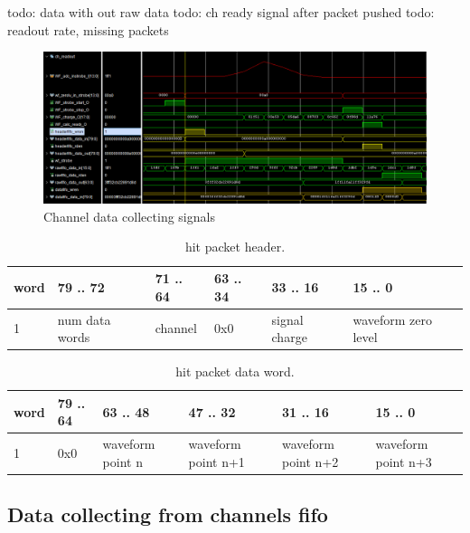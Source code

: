 \documentclass{article}
\begin{document}
todo: data with out raw data
todo: ch ready signal after packet pushed
todo: readout rate, missing packets

\begin{figure}[H]
	\centering 
	\includegraphics[width=1.0\textwidth]{ADC_ch_data_collector_wave.png}
	\caption{\label{fig:2} Channel data collecting signals}
\end{figure}





\begin{table}[H]
\centering
\begin{tabular}{| l | l | l | l | l | l |}
\hline
word & 79 .. 72 & 71 .. 64 & 63 .. 34 & 33 .. 16 & 15 .. 0 \\ \hline
1 & num data words & channel & 0x0 & signal charge & waveform zero level \\ \hline
\end{tabular}
\caption{hit packet header.\label{tab1}}
\end{table}

\begin{table}[H]
\centering
\begin{tabular}{| l | l | l | l | l | l |}
\hline
word & 79 .. 64 & 63 .. 48 & 47 .. 32 & 31 .. 16 & 15 .. 0 \\ \hline
1 & 0x0 & waveform point n & waveform point n+1 & waveform point n+2 & waveform point n+3 \\ \hline
\end{tabular}
\caption{hit packet data word.\label{tab1}}
\end{table}








\subsection{Data collecting from channels fifo}
\end{document}
